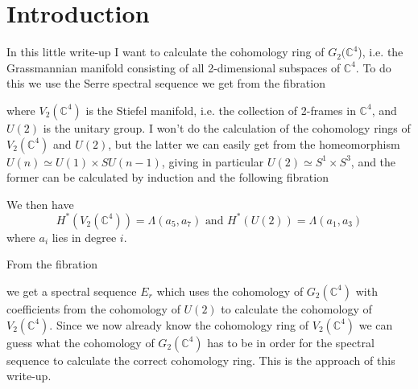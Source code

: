 \section{Introduction}

In this little write-up I want to calculate the cohomology ring of $G_2(\mathbb{C}^4$), 
i.e. the Grassmannian manifold consisting of all 2-dimensional subspaces of $\mathbb{C}^4$. 
To do this we use the Serre spectral sequence we get from the fibration
\begin{center}
\end{center}

where $V_2(\mathbb{C}^4)$ is the Stiefel manifold, 
i.e. the collection of 2-frames in $\mathbb{C}^4$, and $U(2)$ is the unitary group. 
I won't do the calculation of the cohomology rings of $V_2(\mathbb{C}^4)$ and $U(2)$, 
but the latter we can easily get from the homeomorphism $U(n) \simeq U(1)\times SU(n-1)$, 
giving in particular $U(2)\simeq S^1\times S^3$, and the former can be calculated by induction and the following fibration
\begin{center}
\end{center}

We then have 
\begin{equation*}
    H^*(V_2(\mathbb{C}^4)) = \Lambda(a_5, a_7) \text{ and } H^*(U(2)) = \Lambda(a_1, a_3)
\end{equation*}
where $a_i$ lies in degree $i$. 

From the fibration 
\begin{center}
\end{center}
we get a spectral sequence $E_r$ which uses the cohomology of $G_2(\mathbb{C}^4)$ with coefficients from the cohomology of $U(2)$ to calculate the cohomology of $V_2(\mathbb{C}^4)$. 
Since we now already know the cohomology ring of $V_2(\mathbb{C}^4)$ we can guess what the cohomology of $G_2(\mathbb{C}^4)$ has to be in order for the spectral sequence to calculate the correct cohomology ring. 
This is the approach of this write-up. 